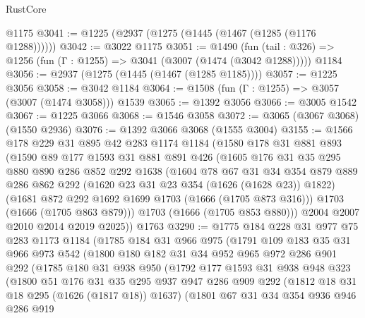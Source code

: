 \begin{lexlean}{RustCore}
\begin{coremodule}
    @1175
@3041 := @1225 (@2937 (@1275 (@1445 (@1467 (@1285 (@1176 @1288))))))
@3042 := @3022 @1175
@3051 := @1490
    (fun (tail : @326) => @1256 (fun (Γ : @1255) => @3041 (@3007 (@1474 (@3042 @1288)))))
    @1184
@3056 := @2937 (@1275 (@1445 (@1467 (@1285 @1185))))
@3057 := @1225 @3056
@3058 := @3042 @1184
@3064 := @1508 (fun (Γ : @1255) => @3057 (@3007 (@1474 @3058))) @1539
@3065 := @1392 @3056
@3066 := @3005 @1542
@3067 := @1225 @3066
@3068 := @1546 @3058
@3072 := @3065 (@3067 @3068) (@1550 @2936)
@3076 := @1392 @3066 @3068 (@1555 @3004)
@3155 := @1566
    @178
    @229
    @31
    @895
    @42
    @283
    @1174
    @1184
    (@1580
      @178
      @31
      @881
      @893
      (@1590
        @89
        @177
        @1593
        @31
        @881
        @891
        @426
        (@1605
          @176
          @31
          @35
          @295
          @880
          @890
          @286
          @852
          @292
          @1638
          (@1604
            @78
            @67
            @31
            @34
            @354
            @879
            @889
            @286
            @862
            @292
            (@1620 @23 @31 @23 @354 (@1626 (@1628 @23)) @1822)
            (@1681 @872 @292 @1692 @1699 @1703 (@1666 (@1705 @873 @316)))
            @1703
            (@1666 (@1705 @863 @879)))
          @1703
          (@1666 (@1705 @853 @880)))
        @2004
        @2007
        @2010
        @2014
        @2019
        @2025))
    @1763
@3290 := @1775
    @184
    @228
    @31
    @977
    @75
    @283
    @1173
    @1184
    (@1785
      @184
      @31
      @966
      @975
      (@1791
        @109
        @183
        @35
        @31
        @966
        @973
        @542
        (@1800
          @180
          @182
          @31
          @34
          @952
          @965
          @972
          @286
          @901
          @292
          (@1785
            @180
            @31
            @938
            @950
            (@1792
              @177
              @1593
              @31
              @938
              @948
              @323
              (@1800
                @51
                @176
                @31
                @35
                @295
                @937
                @947
                @286
                @909
                @292
                (@1812 @18 @31 @18 @295 (@1626 (@1817 @18)) @1637)
                (@1801
                  @67
                  @31
                  @34
                  @354
                  @936
                  @946
                  @286
                  @919

\end{coremodule}
\end{lexlean}
